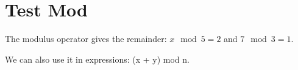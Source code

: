\documentclass[a4paper,10pt,fleqn]{article}
\begin{document}
\section*{Test Mod}

\noindent The modulus operator gives the remainder: $x \mod 5 = 2$ and $7 \mod 3 = 1$.

\bigskip

\noindent We can also use it in expressions: (x + y) mod n.

\bigskip
\end{document}
